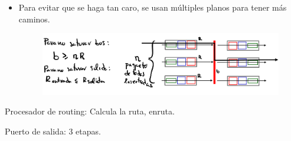 \documentclass[12pt, twoside, openright]{report} %
\begin{document}
\begin{itemize}
\begin{itemize}
        \begin{itemize}
        \item
          Para evitar que se haga tan caro, se usan múltiples planos
          para tener más caminos.
		  \begin{figure}[H]
			{\includegraphics[scale=.2]{Untitled 25.png}}
		\end{figure}
        \end{itemize}

       
      \end{itemize}
    \end{itemize}
  
    Procesador de routing: Calcula la ruta, enruta.

	Puerto de salida: 3 etapas.
\end{document}
